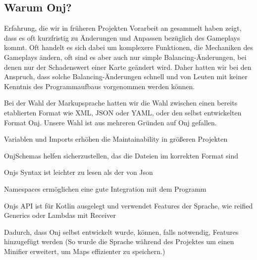 
\subsection{Warum Onj?}\label{subsec:warum-onj}

\renewcommand{\kapitelautor}{Autor: Marvin Kurka}

Erfahrung, die wir in früheren Projekten \bzw Vorarbeit an \FF gesammelt haben zeigt, dass
es oft kurzfristig zu Änderungen und Anpassen bezüglich des Gameplays kommt.
Oft handelt es sich dabei um komplexere Funktionen, die Mechaniken des Gameplays ändern, oft sind es aber auch nur
simple Balancing-Änderungen, bei denen \zB nur der Schadenswert einer Karte geändert wird.
Daher hatten wir bei \FF den Anspruch, dass solche Balancing-Änderungen schnell und von Leuten mit keiner Kenntnis
des Programmaufbaus vorgenommen werden können.

Bei der Wahl der Markupsprache hatten wir die Wahl zwischen einen bereits etablierten Format wie XML, JSON oder YAML,
oder den selbst entwickelten Format Onj.
Unsere Wahl ist aus mehreren Gründen auf Onj gefallen.

\begin{liste}
    \item Variablen und Imports erhöhen die Maintainability in größeren Projekten
    \item OnjSchemas helfen sicherzustellen, das die Dateien im korrekten Format sind
    \item Onjs Syntax ist leichter zu lesen als \zB der von Json
    \item Namespaces ermöglichen eine gute Integration mit dem Programm
    \item Onjs API ist für Kotlin ausgelegt und verwendet Features der Sprache, wie reified Generics oder
        Lambdas mit Receiver
    \item Dadurch, dass Onj selbst entwickelt wurde, können, falls notwendig, Features hinzugefügt werden (So wurde die
        Sprache \zB während des Projektes um einen Minifier erweitert, um Maps effizienter zu speichern.)
\end{liste}

\renewcommand{\kapitelautor}{}
